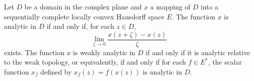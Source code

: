 Let $D$ be a domain in the complex plane and $x$ a mapping of $D$ into a sequentially complete locally convex Hausdorff space $E$. The function $x$ is analytic in $D$ if and only if, for each $z \in D$,
$$\lim_{\zeta \to 0} \frac{x(z + \zeta) - x(z)}{\zeta}$$
exists. The function $x$ is weakly analytic in $D$ if and only if it is analytic relative to the weak topology, or equivalently, if and only if for each $f \in E^*$, the scalar function $x_f$ defined by $x_f(z) = f(x(z))$ is analytic in $D$.
